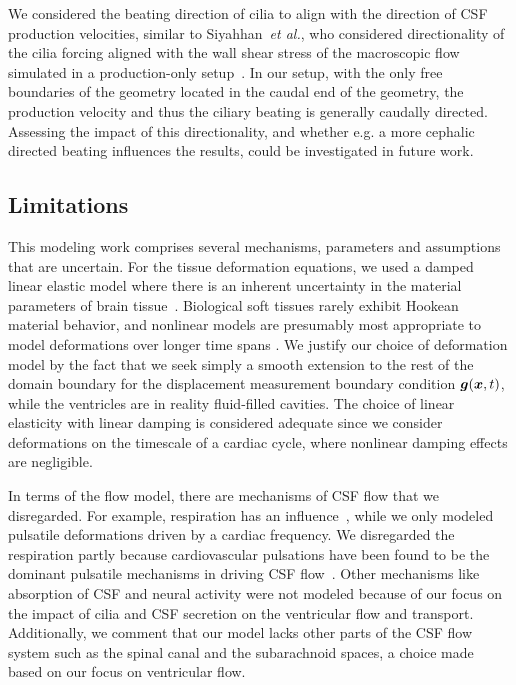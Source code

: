 \documentclass{template}
\begin{document}
We considered the beating direction of cilia to align with the direction of 
CSF production velocities, similar to Siyahhan~\emph{et al.}, who considered
directionality of the cilia forcing aligned
with the wall shear stress of the macroscopic flow simulated in a
production-only setup~\citep{Siyahhan2014FlowVentricles}.
In our setup, with the only free boundaries of the geometry located
in the caudal end of the geometry, the production velocity and thus
the ciliary beating is generally caudally directed. Assessing the impact
of this directionality, and whether e.g. a more cephalic directed beating
influences the results, could be investigated in future work.

\subsection{Limitations}
\label{subsec:limitations}

This modeling work comprises several mechanisms, parameters and
assumptions that are uncertain.
For the tissue deformation equations, we used a damped linear elastic model
where there is an inherent
uncertainty in the material parameters
of brain tissue~\citep{smillie2005hydroelastic}.
Biological soft tissues rarely exhibit Hookean material behavior,
and nonlinear models are presumably most appropriate to
model deformations over longer time spans
\citep{Cheng2010ComputationalModel, Cheng2007UnconfinedCompression,
smillie2005hydroelastic, tully2009coupling, kaczmarek1997hydromechanics}.
We justify our choice of deformation model by the fact that
we seek simply a smooth extension to the rest of the domain boundary
for the displacement measurement boundary condition $\bm{g}(\bm{x}, t)$,
while the ventricles are in reality fluid-filled cavities.
The choice of linear elasticity with linear damping is considered
adequate since we consider deformations on the timescale of a cardiac cycle,
where nonlinear damping effects are negligible.

In terms of the flow model, there are mechanisms of CSF flow that we disregarded.
For example, respiration has an influence~\citep{Vinje2019RespiratoryMeasurements},
while we only modeled pulsatile deformations driven by a cardiac frequency.
We disregarded the respiration partly because cardiovascular pulsations
have been found to be the dominant pulsatile mechanisms
in driving CSF flow~\citep{Soderstrom2025}. Other mechanisms like 
absorption of CSF and neural activity were not modeled because 
of our focus on the impact of cilia and CSF secretion on the
ventricular flow and transport.
Additionally, we comment that our model lacks other
parts of the CSF flow system such
as the spinal canal and the subarachnoid spaces,
a choice made based on our focus on ventricular flow. 
\end{document}
